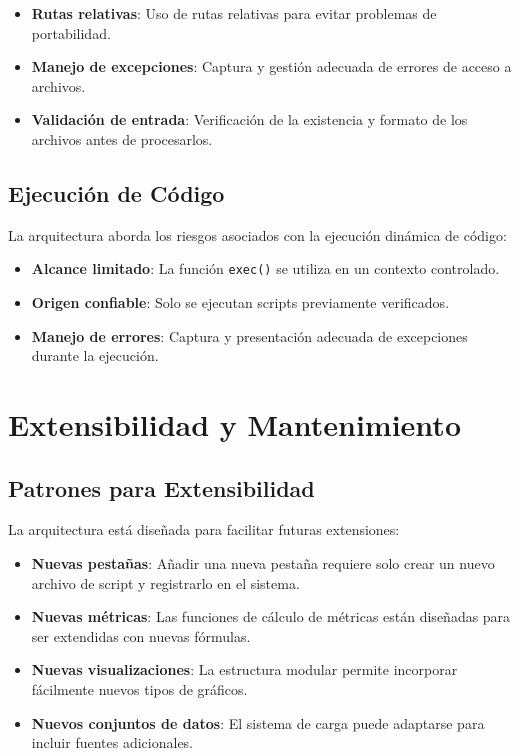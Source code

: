 \begin{itemize}
    \item \textbf{Rutas relativas}: Uso de rutas relativas para evitar problemas de portabilidad.
    \item \textbf{Manejo de excepciones}: Captura y gestión adecuada de errores de acceso a archivos.
    \item \textbf{Validación de entrada}: Verificación de la existencia y formato de los archivos antes de procesarlos.
\end{itemize}

\subsection{Ejecución de Código}
La arquitectura aborda los riesgos asociados con la ejecución dinámica de código:

\begin{itemize}
    \item \textbf{Alcance limitado}: La función \texttt{exec()} se utiliza en un contexto controlado.
    \item \textbf{Origen confiable}: Solo se ejecutan scripts previamente verificados.
    \item \textbf{Manejo de errores}: Captura y presentación adecuada de excepciones durante la ejecución.
\end{itemize}

\section{Extensibilidad y Mantenimiento}

\subsection{Patrones para Extensibilidad}
La arquitectura está diseñada para facilitar futuras extensiones:

\begin{itemize}
    \item \textbf{Nuevas pestañas}: Añadir una nueva pestaña requiere solo crear un nuevo archivo de script y registrarlo en el sistema.
    \item \textbf{Nuevas métricas}: Las funciones de cálculo de métricas están diseñadas para ser extendidas con nuevas fórmulas.
    \item \textbf{Nuevas visualizaciones}: La estructura modular permite incorporar fácilmente nuevos tipos de gráficos.
    \item \textbf{Nuevos conjuntos de datos}: El sistema de carga puede adaptarse para incluir fuentes adicionales.
\end{itemize}

